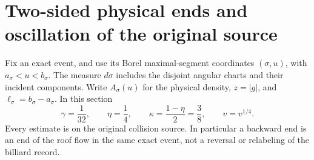 \section{Two-sided physical ends and oscillation of the original source}
\label{sec:v90-two-sided}
Fix an exact event, and use its Borel maximal-segment coordinates
$(\sigma,u)$, with $a_\sigma<u<b_\sigma$. The measure $d\sigma$
includes the disjoint angular charts and their incident components.
Write $A_\sigma(u)$ for the physical density, $z=|g|$, and
$\ell_\sigma=b_\sigma-a_\sigma$. In this section
\[
 \gamma=\frac1{32},\qquad \eta=\frac14,\qquad
 \kappa=\frac{1-\eta}{2}=\frac38,\qquad v=v^{1/4}.
\]
Every estimate is on the original collision source. In particular a
backward end is an end of the roof flow in the same exact event, not
a reversal or relabeling of the billiard record.

